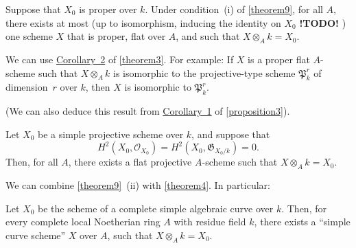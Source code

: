 \documentclass{article}
\theoremstyle{plain}
\newenvironment{corollary}[1]
  {\renewcommand\theinnercustomcorollary{#1}\innercustomcorollary}
  {\endinnercustomcorollary}
\theoremstyle{definition}
\newcommand{\sh}{\mathscr}
\newcommand{\fk}{\mathfrak}
\newcommand{\todo}{\textbf{ !TODO! }}
\begin{document}
\begin{corollary}{1}
\label{theorem9corollary1}
  Suppose that $X_0$ is proper over $k$.
  Under condition~(i) of \cref{theorem9}, for all $A$, there exists at most (up to isomorphism, inducing the identity on $X_0$ \todo) one scheme $X$ that is proper, flat over $A$, and such that $X\otimes_Ak=X_0$.
\end{corollary}

We can use \hyperref[theorem3corollary2]{Corollary~2} of \cref{theorem3}.
For example:
\begin{corollary}{2}
\label{theorem9corollary2}
  If $X$ is a proper flat $A$-scheme such that $X\otimes_Ak$ is isomorphic to the projective-type scheme $\fk{P}_k^r$ of dimension~$r$ over $k$, then $X$ is isomorphic to $\fk{P}_k^r$.
\end{corollary}

(We can also deduce this result from \hyperref[proposition3corollary1]{Corollary~1} of \cref{proposition3}).

\begin{corollary}{3}
\label{theorem9corollary3}
  Let $X_0$ be a simple projective scheme over $k$, and suppose that
  \[
    H^2(X_0,\sh{O}_{X_0}) = H^2(X_0,\fk{G}_{X_0/k}) = 0.
  \]
  Then, for all $A$, there exists a flat projective $A$-scheme such that $X\otimes_Ak=X_0$.
\end{corollary}

We can combine \cref{theorem9}~(ii) with \cref{theorem4}.
In particular:

\begin{corollary}{4}
\label{theorem9corollary4}
  Let $X_0$ be the scheme of a complete simple algebraic curve over $k$.
  Then, for every complete local Noetherian ring $A$ with residue field $k$, there exists a ``simple curve scheme'' $X$ over $A$, such that $X\otimes_Ak=X_0$.
\end{corollary}
\end{document}
